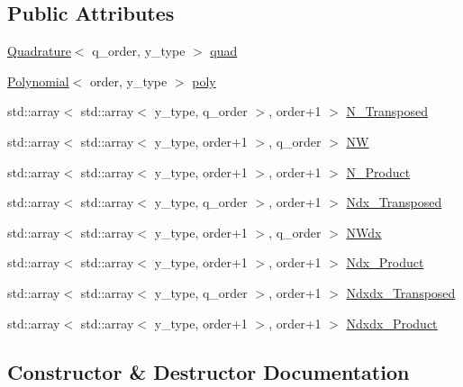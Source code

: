 \subsection*{Public Attributes}
\begin{DoxyCompactItemize}
\item 
\hyperlink{class_quadrature}{Quadrature}$<$ q\+\_\+order, y\+\_\+type $>$ \hyperlink{class_v_m_u_l_t_a4395585e5102243b07c33abc001d1a7a}{quad}
\item 
\hyperlink{class_polynomial}{Polynomial}$<$ order, y\+\_\+type $>$ \hyperlink{class_v_m_u_l_t_ad9e2a7049062262eee02a278aca1da14}{poly}
\item 
std\+::array$<$ std\+::array$<$ y\+\_\+type, q\+\_\+order $>$, order+1 $>$ \hyperlink{class_v_m_u_l_t_a6a9fd7d80d98b790caae6cb72bb6db05}{N\+\_\+\+Transposed}
\item 
std\+::array$<$ std\+::array$<$ y\+\_\+type, order+1 $>$, q\+\_\+order $>$ \hyperlink{class_v_m_u_l_t_ad06ca1f3f261548524b59bd1a6dbe80d}{NW}
\item 
std\+::array$<$ std\+::array$<$ y\+\_\+type, order+1 $>$, order+1 $>$ \hyperlink{class_v_m_u_l_t_a1997e77da014ab5ee4b2c13670845599}{N\+\_\+\+Product}
\item 
std\+::array$<$ std\+::array$<$ y\+\_\+type, q\+\_\+order $>$, order+1 $>$ \hyperlink{class_v_m_u_l_t_a317e137345aaeb4967db30ca7e479435}{Ndx\+\_\+\+Transposed}
\item 
std\+::array$<$ std\+::array$<$ y\+\_\+type, order+1 $>$, q\+\_\+order $>$ \hyperlink{class_v_m_u_l_t_a4fb623e96001cbc01d7289c3465544ec}{N\+Wdx}
\item 
std\+::array$<$ std\+::array$<$ y\+\_\+type, order+1 $>$, order+1 $>$ \hyperlink{class_v_m_u_l_t_a9b41e56739c33dfa1a547b8b0b757d42}{Ndx\+\_\+\+Product}
\item 
std\+::array$<$ std\+::array$<$ y\+\_\+type, q\+\_\+order $>$, order+1 $>$ \hyperlink{class_v_m_u_l_t_a11fec13d3ecba614678ce07a466bdcb1}{Ndxdx\+\_\+\+Transposed}
\item 
std\+::array$<$ std\+::array$<$ y\+\_\+type, order+1 $>$, order+1 $>$ \hyperlink{class_v_m_u_l_t_a74d462b33c24fb447dc7267be3725720}{Ndxdx\+\_\+\+Product}
\end{DoxyCompactItemize}


\subsection{Constructor \& Destructor Documentation}
\mbox{\label{class_v_m_u_l_t_a31d73a0a561c27c4443a167950a9c852}} 

